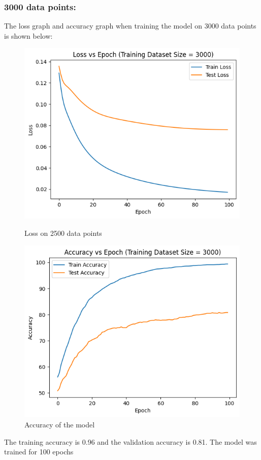 \documentclass{article}
\begin{document}
\subsubsection*{3000 data points:}
The loss graph and accuracy graph when training the model on 3000 data points is shown below:
\begin{figure}[h!]
    \centering
    \begin{minipage}{0.45\textwidth}
        \centering
        \includegraphics[width=1\textwidth]{graphs/output3000.png} %
        \caption{Loss on 2500 data points}
    \end{minipage}\hfill
    \begin{minipage}{0.45\textwidth}
        \centering
        \includegraphics[width=1\textwidth]{graphs/acc3000.png} %
        \caption{Accuracy of the model}
    \end{minipage}
\end{figure}
\newline The training accuracy is 0.96 and the validation accuracy is 0.81. The model was trained for 100 epochs
\end{document}
